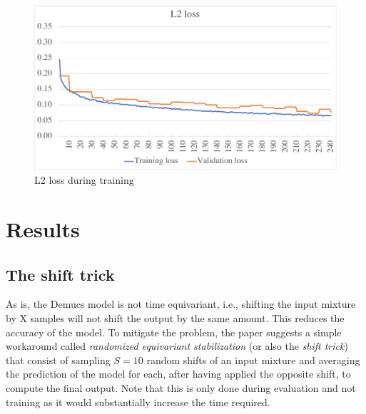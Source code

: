 \documentclass[12pt]{article}
\begin{document}
~

\begin{figure}[h!]
  \centering
  \includegraphics[width=1\linewidth]{l2}
  \caption{L2 loss during training}
  \label{fig:training2}
\end{figure}



\newpage
\section{Results}\label{sec:res}
\subsection{The shift trick}
As is, the Demucs model is not time equivariant, i.e., shifting the input mixture by X samples will not shift the output by the same amount. This reduces the accuracy of the model. To mitigate the problem, the paper suggests a simple workaround called \textit{randomized equivariant stabilization} (or also the \textit{shift trick}) that consist of sampling \(S=10\) random shifts of an input mixture and averaging the prediction of the model for each, after having applied the opposite shift, to compute the final output. Note that this is only done during evaluation and not training as it would substantially increase the time required.
\end{document}
